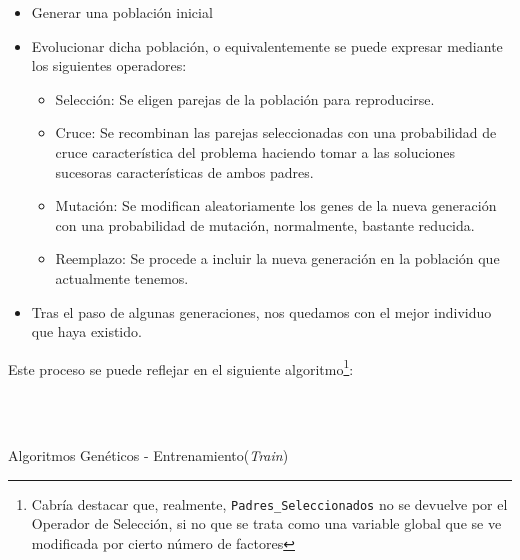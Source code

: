 \documentclass[a4paper, 11pt]{article}
\begin{document}
			\begin{itemize}
				\item Generar una población inicial
				\item Evolucionar dicha población, o equivalentemente se puede expresar mediante los
				siguientes operadores:
					\begin{itemize}
						\item Selección: Se eligen parejas de la población para reproducirse.
						\item Cruce: Se recombinan las parejas seleccionadas con una probabilidad de
						cruce característica del problema haciendo tomar a las soluciones sucesoras
						características de ambos padres.
						\item Mutación: Se modifican aleatoriamente los genes de la nueva generación
						con una probabilidad de mutación, normalmente, bastante reducida.
						\item Reemplazo: Se procede a incluir la nueva generación en la población
						que actualmente tenemos.
					\end{itemize}
				\item Tras el paso de algunas generaciones, nos quedamos con el mejor individuo que
				haya existido.
			\end{itemize}
			
			Este proceso se puede reflejar en el siguiente algoritmo\footnote{Cabría destacar que,
			realmente, \texttt{Padres\_Seleccionados} no se devuelve por el Operador de Selección, si
			no que se trata como una variable global que se ve modificada por cierto número de factores}:
			
			\begin{algorithm}[H]
				\begin{algorithmic}[1]
				\REQUIRE \ \\
						 \
			 
					\ENDIF
				\ENDFOR
				
					\ENDFOR
				\ENDWHILE
				
				\end{algorithmic}
			\caption{Algoritmos Genéticos - Entrenamiento(\textit{Train})}
			\label{GA-Train}
			\end{algorithm}
			
\end{document}
